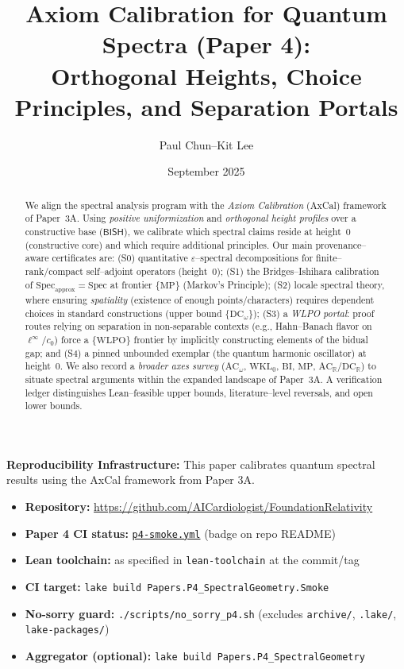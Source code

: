 \documentclass[11pt]{article}
\title{Axiom Calibration for Quantum Spectra (Paper 4):\\
Orthogonal Heights, Choice Principles, and Separation Portals}
\author{Paul Chun--Kit Lee}
\date{September 2025}
\theoremstyle{plain}
\theoremstyle{definition}
\theoremstyle{remark}
\newcommand{\ReproBox}[1]{\begin{mdframed}[linewidth=1pt,linecolor=blue,backgroundcolor=blue!5] #1 \end{mdframed}}
\newcommand{\LeanTarget}[1]{\texttt{#1}}
\newcommand{\linf}{\ell^\infty}
\newcommand{\BISH}{\mathsf{BISH}}
\newcommand{\WLPO}{\mathrm{WLPO}}
\newcommand{\DCw}{\mathrm{DC}_\omega}
\newcommand{\ACw}{\mathrm{AC}_\omega}
\newcommand{\ACR}{\mathrm{AC}_{\mathbb{R}}}
\newcommand{\DCR}{\mathrm{DC}_{\mathbb{R}}}
\newcommand{\WKLz}{\mathrm{WKL}_0}
\newcommand{\BI}{\mathrm{BI}}
\newcommand{\MP}{\mathrm{MP}}
\begin{document}
\maketitle

\begin{abstract}
We align the spectral analysis program with the \emph{Axiom Calibration} (AxCal) framework of Paper~3A.
Using \emph{positive uniformization} and \emph{orthogonal height profiles} over a constructive base ($\BISH$), we calibrate which spectral claims reside at height~0 (constructive core) and which require additional principles.
Our main provenance--aware certificates are:
(S0) quantitative $\varepsilon$--spectral decompositions for finite--rank/compact self--adjoint operators (height~0);
(S1) the Bridges--Ishihara calibration of $\mathrm{Spec}_{\mathrm{approx}}=\mathrm{Spec}$ at frontier $\{\MP\}$ (Markov's Principle);
(S2) locale spectral theory, where ensuring \emph{spatiality} (existence of enough points/characters) requires dependent choices in standard constructions (upper bound $\{\DCw\}$);
(S3) a \emph{WLPO portal}: proof routes relying on separation in non-separable contexts (e.g., Hahn--Banach flavor on $\linf/c_0$) force a $\{\WLPO\}$ frontier by implicitly constructing elements of the bidual gap;
and (S4) a pinned unbounded exemplar (the quantum harmonic oscillator) at height~0.
We also record a \emph{broader axes survey} ($\ACw$, $\WKLz$, $\BI$, $\MP$, $\ACR/\DCR$) to situate spectral arguments within the expanded landscape of Paper~3A.
A verification ledger distinguishes Lean--feasible upper bounds, literature--level reversals, and open lower bounds.
\end{abstract}

\tableofcontents

\ReproBox{
\textbf{Reproducibility Infrastructure:} This paper calibrates quantum spectral results using the AxCal framework from Paper 3A.
\begin{itemize}[leftmargin=*]
  \item \textbf{Repository:} \url{https://github.com/AICardiologist/FoundationRelativity}
  \item \textbf{Paper 4 CI status:} \href{https://github.com/AICardiologist/FoundationRelativity/actions/workflows/p4-smoke.yml}{\texttt{p4-smoke.yml}} (badge on repo README)
  \item \textbf{Lean toolchain:} as specified in \texttt{lean-toolchain} at the commit/tag
  \item \textbf{CI target:} \LeanTarget{lake build Papers.P4\_SpectralGeometry.Smoke}
  \item \textbf{No-sorry guard:} \texttt{./scripts/no\_sorry\_p4.sh} (excludes \texttt{archive/}, \texttt{.lake/}, \texttt{lake-packages/})
  \item \textbf{Aggregator (optional):} \LeanTarget{lake build Papers.P4\_SpectralGeometry}
\end{itemize}
}
\end{document}
